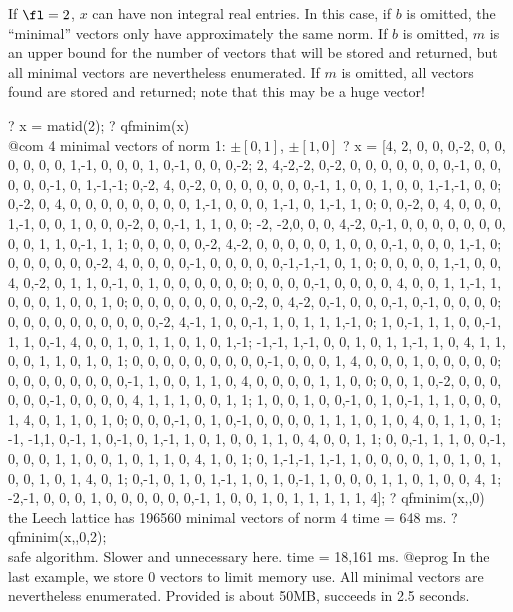 If $\fl=2$, $x$ can have non integral real entries. In this case, if $b$
is omitted, the ``minimal'' vectors only have approximately the same norm.
If $b$ is omitted, $m$ is an upper bound for the number of vectors that
will be stored and returned, but all minimal vectors are nevertheless
enumerated. If $m$ is omitted, all vectors found are stored and returned;
note that this may be a huge vector!

\bprog
? x = matid(2);
? qfminim(x)  \\@com 4 minimal vectors of norm 1: $\pm[0,1]$, $\pm[1,0]$
? { x =
[4, 2, 0, 0, 0,-2, 0, 0, 0, 0, 0, 0, 1,-1, 0, 0, 0, 1, 0,-1, 0, 0, 0,-2;
 2, 4,-2,-2, 0,-2, 0, 0, 0, 0, 0, 0, 0,-1, 0, 0, 0, 0, 0,-1, 0, 1,-1,-1;
 0,-2, 4, 0,-2, 0, 0, 0, 0, 0, 0, 0,-1, 1, 0, 0, 1, 0, 0, 1,-1,-1, 0, 0;
 0,-2, 0, 4, 0, 0, 0, 0, 0, 0, 0, 0, 1,-1, 0, 0, 0, 1,-1, 0, 1,-1, 1, 0;
 0, 0,-2, 0, 4, 0, 0, 0, 1,-1, 0, 0, 1, 0, 0, 0,-2, 0, 0,-1, 1, 1, 0, 0;
-2, -2,0, 0, 0, 4,-2, 0,-1, 0, 0, 0, 0, 0, 0, 0, 0, 0, 1, 1, 0,-1, 1, 1;
 0, 0, 0, 0, 0,-2, 4,-2, 0, 0, 0, 0, 0, 1, 0, 0, 0,-1, 0, 0, 0, 1,-1, 0;
 0, 0, 0, 0, 0, 0,-2, 4, 0, 0, 0, 0,-1, 0, 0, 0, 0, 0,-1,-1,-1, 0, 1, 0;
 0, 0, 0, 0, 1,-1, 0, 0, 4, 0,-2, 0, 1, 1, 0,-1, 0, 1, 0, 0, 0, 0, 0, 0;
 0, 0, 0, 0,-1, 0, 0, 0, 0, 4, 0, 0, 1, 1,-1, 1, 0, 0, 0, 1, 0, 0, 1, 0;
 0, 0, 0, 0, 0, 0, 0, 0,-2, 0, 4,-2, 0,-1, 0, 0, 0,-1, 0,-1, 0, 0, 0, 0;
 0, 0, 0, 0, 0, 0, 0, 0, 0, 0,-2, 4,-1, 1, 0, 0,-1, 1, 0, 1, 1, 1,-1, 0;
 1, 0,-1, 1, 1, 0, 0,-1, 1, 1, 0,-1, 4, 0, 0, 1, 0, 1, 1, 0, 1, 0, 1,-1;
-1,-1, 1,-1, 0, 0, 1, 0, 1, 1,-1, 1, 0, 4, 1, 1, 0, 0, 1, 1, 0, 1, 0, 1;
 0, 0, 0, 0, 0, 0, 0, 0, 0,-1, 0, 0, 0, 1, 4, 0, 0, 0, 1, 0, 0, 0, 0, 0;
 0, 0, 0, 0, 0, 0, 0, 0,-1, 1, 0, 0, 1, 1, 0, 4, 0, 0, 0, 0, 1, 1, 0, 0;
 0, 0, 1, 0,-2, 0, 0, 0, 0, 0, 0,-1, 0, 0, 0, 0, 4, 1, 1, 1, 0, 0, 1, 1;
 1, 0, 0, 1, 0, 0,-1, 0, 1, 0,-1, 1, 1, 0, 0, 0, 1, 4, 0, 1, 1, 0, 1, 0;
 0, 0, 0,-1, 0, 1, 0,-1, 0, 0, 0, 0, 1, 1, 1, 0, 1, 0, 4, 0, 1, 1, 0, 1;
-1, -1,1, 0,-1, 1, 0,-1, 0, 1,-1, 1, 0, 1, 0, 0, 1, 1, 0, 4, 0, 0, 1, 1;
 0, 0,-1, 1, 1, 0, 0,-1, 0, 0, 0, 1, 1, 0, 0, 1, 0, 1, 1, 0, 4, 1, 0, 1;
 0, 1,-1,-1, 1,-1, 1, 0, 0, 0, 0, 1, 0, 1, 0, 1, 0, 0, 1, 0, 1, 4, 0, 1;
 0,-1, 0, 1, 0, 1,-1, 1, 0, 1, 0,-1, 1, 0, 0, 0, 1, 1, 0, 1, 0, 0, 4, 1;
-2,-1, 0, 0, 0, 1, 0, 0, 0, 0, 0, 0,-1, 1, 0, 0, 1, 0, 1, 1, 1, 1, 1, 4]; }
? qfminim(x,,0)  \\ the Leech lattice has 196560 minimal vectors of norm 4
time = 648 ms.
? qfminim(x,,0,2); \\ safe algorithm. Slower and unnecessary here.
time = 18,161 ms.
@eprog\noindent{}
In the last example, we store 0 vectors to limit memory use. All minimal
vectors are nevertheless enumerated. Provided  is about 50MB,
 succeeds in 2.5 seconds.

